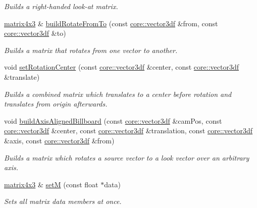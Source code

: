 \begin{DoxyCompactItemize}
\begin{DoxyCompactList}\small\item\em Builds a right-\/handed look-\/at matrix. \end{DoxyCompactList}\item 
\hyperlink{classirr_1_1core_1_1matrix4x3}{matrix4x3} \& \hyperlink{classirr_1_1core_1_1matrix4x3_a379a442f6c24799853d614d593385ca1}{build\+Rotate\+From\+To} (const \hyperlink{namespaceirr_1_1core_a06f169d08b5c429f5575acb7edbad811}{core\+::vector3df} \&from, const \hyperlink{namespaceirr_1_1core_a06f169d08b5c429f5575acb7edbad811}{core\+::vector3df} \&to)
\begin{DoxyCompactList}\small\item\em Builds a matrix that rotates from one vector to another. \end{DoxyCompactList}\item 
void \hyperlink{classirr_1_1core_1_1matrix4x3_a2585391fcb65724f6cfc56e44e5d8fbd}{set\+Rotation\+Center} (const \hyperlink{namespaceirr_1_1core_a06f169d08b5c429f5575acb7edbad811}{core\+::vector3df} \&center, const \hyperlink{namespaceirr_1_1core_a06f169d08b5c429f5575acb7edbad811}{core\+::vector3df} \&translate)
\begin{DoxyCompactList}\small\item\em Builds a combined matrix which translates to a center before rotation and translates from origin afterwards. \end{DoxyCompactList}\item 
void \hyperlink{classirr_1_1core_1_1matrix4x3_a7e96ec4e47a175574d7b55c336107fc3}{build\+Axis\+Aligned\+Billboard} (const \hyperlink{namespaceirr_1_1core_a06f169d08b5c429f5575acb7edbad811}{core\+::vector3df} \&cam\+Pos, const \hyperlink{namespaceirr_1_1core_a06f169d08b5c429f5575acb7edbad811}{core\+::vector3df} \&center, const \hyperlink{namespaceirr_1_1core_a06f169d08b5c429f5575acb7edbad811}{core\+::vector3df} \&translation, const \hyperlink{namespaceirr_1_1core_a06f169d08b5c429f5575acb7edbad811}{core\+::vector3df} \&axis, const \hyperlink{namespaceirr_1_1core_a06f169d08b5c429f5575acb7edbad811}{core\+::vector3df} \&from)
\begin{DoxyCompactList}\small\item\em Builds a matrix which rotates a source vector to a look vector over an arbitrary axis. \end{DoxyCompactList}\item 
\hyperlink{classirr_1_1core_1_1matrix4x3}{matrix4x3} \& \hyperlink{classirr_1_1core_1_1matrix4x3_a46ed512bed19dd32c2181d47ac89fe28}{setM} (const float $\ast$data)\hypertarget{classirr_1_1core_1_1matrix4x3_a46ed512bed19dd32c2181d47ac89fe28}{}\label{classirr_1_1core_1_1matrix4x3_a46ed512bed19dd32c2181d47ac89fe28}

\begin{DoxyCompactList}\small\item\em Sets all matrix data members at once. \end{DoxyCompactList}\end{DoxyCompactItemize}



